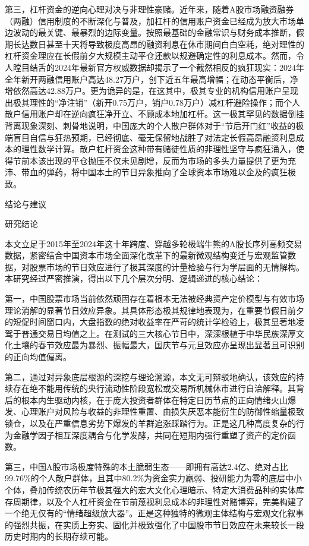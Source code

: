\documentclass{cupb-thesis}
\begin{document}
第三，杠杆资金的逆向心理对决与非理性豪赌。近年来，随着A股市场融资融券（两融）信用制度的不断深化与普及，加杠杆的信用账户资金已经成为放大市场单边波动的最关键、最暴烈的边际变量。按照最基础的金融常识与财务成本推断，假期长达数日甚至十天将导致极度高昂的融资利息在休市期间白白空耗，绝对理性的杠杆资金理应在长假前夕大规模主动平仓还款以规避确定性的利息成本。然而，令人瞠目结舌的2024年最新官方权威数据却揭示了一个截然相反的疯狂现实：2024年全年新开两融信用账户高达48.27万户，创下近五年最高增幅；在动态平衡后，净增依然高达42.88万户。更为诡异的是，在这其中，极其专业的机构信用账户呈现出极其理性的“净注销”（新开0.75万户，销户0.78万户）减杠杆避险操作；而个人散户信用账户却在逆向疯狂净开立、不顾成本地加杠杆。这一极其罕见的数据倒挂背离现象深刻、刺骨地说明，中国庞大的个人散户群体对于“节后开门红”收益的极端盲目自信与狂热预期，已经彻底、毫无保留地战胜了对法定长假高昂融资利息成本的理性数学计算。散户杠杆资金这种带有赌徒性质的非理性坚守与疯狂涌入，使得节前本该出现的平仓抛压不仅未见剧增，反而为市场的多头力量提供了更为充沛、带血的弹药，将中国本土的节日异象推向了全球资本市场难以企及的疯狂极致。


结论与建议

研究结论

本文立足于2015年至2024年这十年跨度、穿越多轮极端牛熊的A股长序列高频交易数据，紧密结合中国资本市场全面深化改革下的最新微观结构变迁与宏观监管数据，对股票市场的节日效应进行了极其深度的计量检验与行为学层面的无情解构。本研究经过严密推演，得出以下几个层次分明、逻辑递进的核心结论：


第一，中国股票市场当前依然顽固存在着根本无法被经典资产定价模型与有效市场理论消解的显著节日效应异象。其具体形态极其规律地表现为，在重要节假日前夕的短促时间窗口内，大盘指数的绝对收益率在严苛的统计学检验上，极其显著地凌驾于普通交易日均值之上。在测试的三大核心节日中，深深根植于中华民族深厚文化土壤的春节效应最为暴烈、振幅最大，国庆节与元旦效应亦呈现出显著且可识别的正向均值偏离。

第二，通过对异象底层根源的深挖与理论溯源，本文无可辩驳地确认，该效应的持续存在绝不能用传统的央行流动性阶段宽松或交易所机械休市进行自洽解释。其背后的根本内生驱动内核，在于庞大投资者群体在特定日历节点的正向情绪火山爆发、心理账户对风险与收益的非理性重置、由损失厌恶本能衍生的防御性缩量极致锁仓，以及在严重信息劣势下爆发的羊群追涨踩踏行为。正是这几种高度复杂的行为金融学因子相互深度耦合与化学发酵，共同在短期内强行重塑了资产的定价函数。

第三，中国A股市场极度特殊的本土脆弱生态——即拥有高达2.4亿、绝对占比99.76\%的个人散户群体，且其中80.2\%为资金实力羸弱、投研能力为零的底层中小个体，叠加传统农历年节极其强大的宏大文化心理暗示、特定大消费品种的实体库存周期律，以及个人杠杆资金在节前蔑视利息成本的非理性对赌博弈，完美构建了一个绝无仅有的“情绪超级放大器”。正是这种独特的微观主体结构与宏观文化叙事的强烈共振，在实质上夯实、固化并极致强化了中国股市节日效应在未来较长一段历史时期内的长期存续可能。
\end{document}
